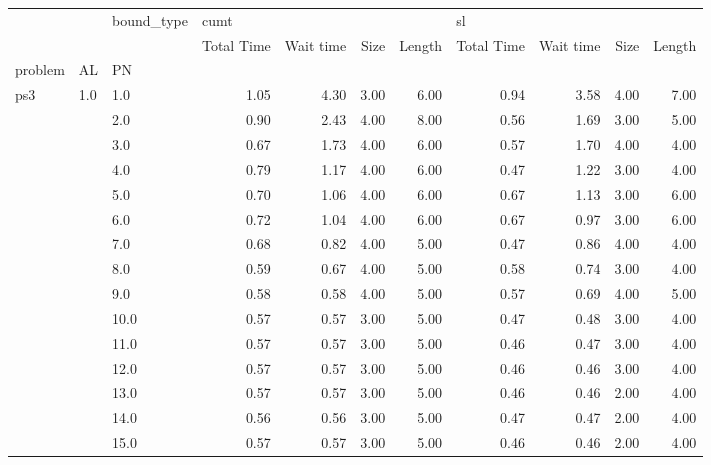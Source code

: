 \begin{tabular}{lllrrrrrrrr}
\toprule
      &     & bound\_type & \multicolumn{4}{l}{cumt} & \multicolumn{4}{l}{sl} \\
      &     & {} & Total Time & Wait time & Size & Length & Total Time & Wait time & Size & Length \\
problem & AL & PN &            &           &      &        &            &           &      &        \\
\midrule
ps3 & 1.0 & 1.0  &       1.05 &      4.30 & 3.00 &   6.00 &       0.94 &      3.58 & 4.00 &   7.00 \\
      &     & 2.0  &       0.90 &      2.43 & 4.00 &   8.00 &       0.56 &      1.69 & 3.00 &   5.00 \\
      &     & 3.0  &       0.67 &      1.73 & 4.00 &   6.00 &       0.57 &      1.70 & 4.00 &   4.00 \\
      &     & 4.0  &       0.79 &      1.17 & 4.00 &   6.00 &       0.47 &      1.22 & 3.00 &   4.00 \\
      &     & 5.0  &       0.70 &      1.06 & 4.00 &   6.00 &       0.67 &      1.13 & 3.00 &   6.00 \\
      &     & 6.0  &       0.72 &      1.04 & 4.00 &   6.00 &       0.67 &      0.97 & 3.00 &   6.00 \\
      &     & 7.0  &       0.68 &      0.82 & 4.00 &   5.00 &       0.47 &      0.86 & 4.00 &   4.00 \\
      &     & 8.0  &       0.59 &      0.67 & 4.00 &   5.00 &       0.58 &      0.74 & 3.00 &   4.00 \\
      &     & 9.0  &       0.58 &      0.58 & 4.00 &   5.00 &       0.57 &      0.69 & 4.00 &   5.00 \\
      &     & 10.0 &       0.57 &      0.57 & 3.00 &   5.00 &       0.47 &      0.48 & 3.00 &   4.00 \\
      &     & 11.0 &       0.57 &      0.57 & 3.00 &   5.00 &       0.46 &      0.47 & 3.00 &   4.00 \\
      &     & 12.0 &       0.57 &      0.57 & 3.00 &   5.00 &       0.46 &      0.46 & 3.00 &   4.00 \\
      &     & 13.0 &       0.57 &      0.57 & 3.00 &   5.00 &       0.46 &      0.46 & 2.00 &   4.00 \\
      &     & 14.0 &       0.56 &      0.56 & 3.00 &   5.00 &       0.47 &      0.47 & 2.00 &   4.00 \\
      &     & 15.0 &       0.57 &      0.57 & 3.00 &   5.00 &       0.46 &      0.46 & 2.00 &   4.00 \\

\end{tabular}
